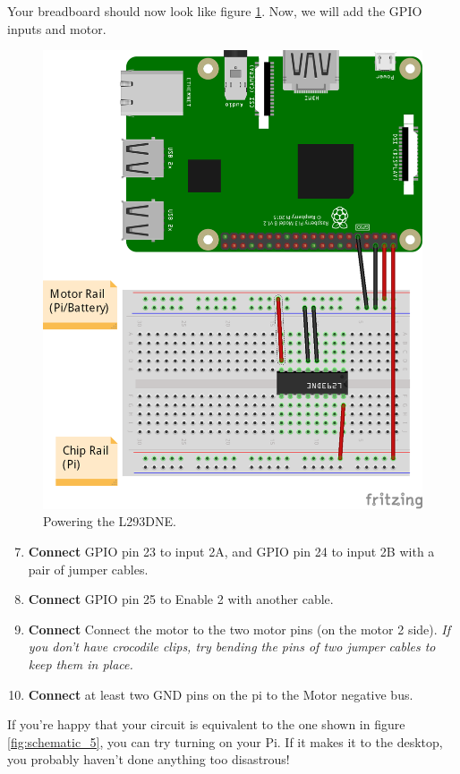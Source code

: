 		Your breadboard should now look like figure \ref{fig:schematic_3}. Now, we will add the GPIO inputs and motor.
		
		\begin{figure}[h]
			\centering
			\includegraphics[width=0.6\linewidth]{img/schematic_3}
			\caption{Powering the L293DNE.}
			\label{fig:schematic_3}
		\end{figure}
		
		\begin{enumerate}[noitemsep]
			\setcounter{enumi}{6}
			\item \textbf{Connect} GPIO pin 23 to input 2A, and GPIO pin 24 to input 2B with a pair of jumper cables.
			\item \textbf{Connect} GPIO pin 25 to Enable 2 with another cable.
			\item \textbf{Connect} Connect the motor to the two motor pins (on the motor 2 side). \scriptsize \textit{If you don't have crocodile clips, try bending the pins of two jumper cables to keep them in place.} \normalsize
			\item \textbf{Connect} at least two GND pins on the pi to the Motor negative bus.
		\end{enumerate}
		
		If you're happy that your circuit is equivalent to the one shown in figure \ref{fig:schematic_5}, you can try turning on your Pi. If it makes it to the desktop, you probably haven't done anything too disastrous!
		
